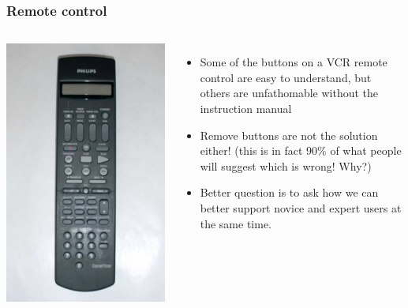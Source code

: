 \documentclass{beamer}
\begin{document}
\begin{frame}
\frametitle{Remote control}
\begin{columns}[c] %
	
	\centering
	\includegraphics[width=0.8\linewidth]{remote}
	
	\begin{itemize}
		\item Some of the buttons on a VCR remote control are easy to understand, but others are unfathomable without the instruction manual
		\item Remove buttons are not the solution either!  (this is in fact 90\% of what people will suggest which is wrong!  Why?)
		\item Better question is to ask how we can better support novice and expert users at the same time.
	\end{itemize}
\end{columns}
\end{frame}
\end{document}
